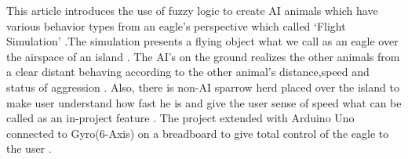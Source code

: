 This article introduces the use of fuzzy logic to create AI animals which have various behavior types from an eagle’s perspective  which called ‘Flight Simulation’ .The simulation presents a flying object what we call as an eagle over the airspace of an island . The AI’s on the ground realizes the other animals from a clear distant behaving  according to the other animal’s distance,speed and status of aggression . Also, there is non-AI sparrow herd placed over the island to make user understand how fast he is and give the user sense of speed what can be called as an in-project feature .  The project extended with Arduino Uno connected to Gyro(6-Axis) on a breadboard to give total control of the eagle  to the user . 


